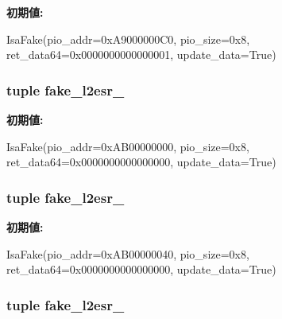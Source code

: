 {\bfseries 初期値:}
\begin{DoxyCode}
IsaFake(pio_addr=0xA9000000C0, pio_size=0x8,
            ret_data64=0x0000000000000001, update_data=True)
\end{DoxyCode}
\hypertarget{classT1000_1_1T1000_ac5267c667fdb38d55ec3ad9eed0663b0}{
\subsubsection[{fake\_\-l2esr\_\-1}]{\setlength{\rightskip}{0pt plus 5cm}tuple {\bf fake\_\-l2esr\_}}}
\label{classT1000_1_1T1000_ac5267c667fdb38d55ec3ad9eed0663b0}
{\bfseries 初期値:}
\begin{DoxyCode}
IsaFake(pio_addr=0xAB00000000, pio_size=0x8,
            ret_data64=0x0000000000000000, update_data=True)
\end{DoxyCode}
\hypertarget{classT1000_1_1T1000_a50827ba8228ca2d96f9e06b176180c20}{
\subsubsection[{fake\_\-l2esr\_\-2}]{\setlength{\rightskip}{0pt plus 5cm}tuple {\bf fake\_\-l2esr\_}}}
\label{classT1000_1_1T1000_a50827ba8228ca2d96f9e06b176180c20}
{\bfseries 初期値:}
\begin{DoxyCode}
IsaFake(pio_addr=0xAB00000040, pio_size=0x8,
            ret_data64=0x0000000000000000, update_data=True)
\end{DoxyCode}
\hypertarget{classT1000_1_1T1000_ac5289087f2bf85185262d640415a3177}{
\subsubsection[{fake\_\-l2esr\_\-3}]{\setlength{\rightskip}{0pt plus 5cm}tuple {\bf fake\_\-l2esr\_}}}
\label{classT1000_1_1T1000_ac5289087f2bf85185262d640415a3177}
